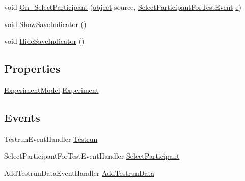 \begin{DoxyCompactItemize}
\item 
void \hyperlink{class_web_analyzer_1_1_u_i_1_1_interaction_objects_1_1_testrun_control_aa6efe805f8e05a4fb701e214d8e53bec}{On\+\_\+\+Select\+Participant} (\hyperlink{_u_i_2_h_t_m_l_resources_2js_2lib_2underscore_8min_8js_aae18b7515bb2bc4137586506e7c0c903}{object} source, \hyperlink{class_web_analyzer_1_1_events_1_1_select_participant_for_test_event}{Select\+Participant\+For\+Test\+Event} \hyperlink{_u_i_2_h_t_m_l_resources_2js_2lib_2bootstrap_8min_8js_ab5902775854a8b8440bcd25e0fe1c120}{e})
\item 
void \hyperlink{class_web_analyzer_1_1_u_i_1_1_interaction_objects_1_1_testrun_control_a63c62507fe21c9a5af3ec6fcef4072d3}{Show\+Save\+Indicator} ()
\item 
void \hyperlink{class_web_analyzer_1_1_u_i_1_1_interaction_objects_1_1_testrun_control_a607f5823a334e7a7bed326085fb65bc6}{Hide\+Save\+Indicator} ()
\end{DoxyCompactItemize}
\subsection*{Properties}
\begin{DoxyCompactItemize}
\item 
\hyperlink{class_web_analyzer_1_1_models_1_1_base_1_1_experiment_model}{Experiment\+Model} \hyperlink{class_web_analyzer_1_1_u_i_1_1_interaction_objects_1_1_testrun_control_a050243f65141cdf9dd7aa11125a30c0a}{Experiment}
\end{DoxyCompactItemize}
\subsection*{Events}
\begin{DoxyCompactItemize}
\item 
Testrun\+Event\+Handler \hyperlink{class_web_analyzer_1_1_u_i_1_1_interaction_objects_1_1_testrun_control_aec90f2bc94369619608e0059453752d3}{Testrun}
\item 
Select\+Participant\+For\+Test\+Event\+Handler \hyperlink{class_web_analyzer_1_1_u_i_1_1_interaction_objects_1_1_testrun_control_abf256e52c1a039ca329f7c749a9087e4}{Select\+Participant}
\item 
Add\+Testrun\+Data\+Event\+Handler \hyperlink{class_web_analyzer_1_1_u_i_1_1_interaction_objects_1_1_testrun_control_ae68ced3ba48613d9aa1469c128e62419}{Add\+Testrun\+Data}
\end{DoxyCompactItemize}

